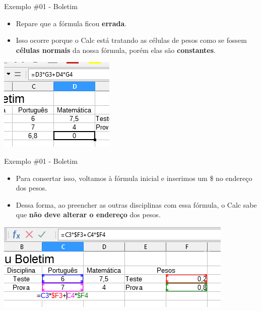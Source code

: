 \begin{frame}{Exemplo \#01 - Boletim}
	\begin{block}{}
		\begin{itemize}
			\item Repare que a fórmula ficou \textbf{errada}.
			\item Isso ocorre porque o Calc está tratando as células de pesos como se fossem \textbf{células normais} da nossa fórmula, porém elas são \textbf{constantes}.
		\end{itemize}
	\end{block}
	
	\centering
	\includegraphics[width=0.6\linewidth]{Figuras/Ch06/fig44.4}
\end{frame}


\begin{frame}{Exemplo \#01 - Boletim}
	\begin{block}{}
		\begin{itemize}
			\item Para consertar isso, voltamos à fórmula inicial e inserimos um \$ no endereço dos pesos.
			\item Dessa forma, ao preencher as outras disciplinas com essa fórmula, o Calc sabe que \textbf{não deve alterar o endereço} dos pesos.
		\end{itemize}
	\end{block}
	
	\bigskip
	
	\centering
	\includegraphics[width=1\linewidth]{Figuras/Ch06/fig44.5}
\end{frame}


